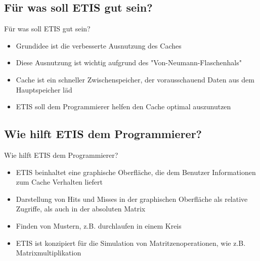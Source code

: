 \subsection{Für was soll ETIS gut sein?}
\begin{frame}
\begin{block}{Für was soll ETIS gut sein?}
\begin{itemize}[<+->]
\pause\item Grundidee ist die verbesserte Ausnutzung des Caches
\item Diese Ausnutzung ist wichtig aufgrund des "Von-Neumann-Flaschenhals"
\item Cache ist ein schneller Zwischenspeicher, der vorausschauend Daten aus dem Hauptspeicher läd
\item ETIS soll dem Programmierer helfen den Cache optimal auszunutzen
\end{itemize}
\end{block}
\end{frame}

\subsection{Wie hilft ETIS dem Programmierer?}
\begin{frame}
\begin{block}{Wie hilft ETIS dem Programmierer?}
\begin{itemize}[<+->]
\pause\item ETIS beinhaltet eine graphische Oberfläche, die dem Benutzer Informationen zum Cache Verhalten liefert
\item Darstellung von Hits und Misses in der graphischen Oberfläche als relative Zugriffe, als auch in der absoluten Matrix
\item Finden von Mustern, z.B. durchlaufen in einem Kreis
\item ETIS ist konzipiert für die Simulation von Matritzenoperationen, wie z.B. Matrixmultiplikation
\end{itemize}
\end{block}
\end{frame}


